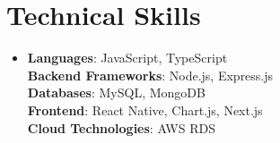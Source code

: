 \documentclass[letterpaper,11pt]{article}
\begin{document}
\section{Technical Skills} %
\begin{itemize}[leftmargin=0.15in, label={}]
\item{
\textbf{Languages}{: JavaScript, TypeScript} \\
\textbf{Backend Frameworks}{: Node.js, Express.js} \\
\textbf{Databases}{: MySQL, MongoDB} \\
\textbf{Frontend}{: React Native, Chart.js, Next.js} \\
\textbf{Cloud Technologies}{: AWS RDS}
} \\
\end{itemize}


\end{document}
